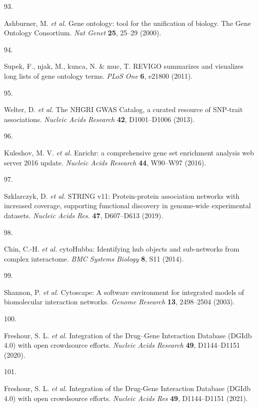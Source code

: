 \documentclass[
  11,
  a4paper,
]{article}
\newlength{\cslhangindent}
\newlength{\csllabelwidth}
\newlength{\cslentryspacingunit} %
\newenvironment{CSLReferences}[2] %
 {%
  \setlength{\parindent}{0pt}
  \ifodd #1
  \let\oldpar\par
  \def\par{\hangindent=\cslhangindent\oldpar}
  \fi
  \setlength{\parskip}{#2\cslentryspacingunit}
 }%
 {}
\newcommand{\CSLLeftMargin}[1]{\parbox[t]{\csllabelwidth}{#1}}
\newcommand{\CSLRightInline}[1]{\parbox[t]{\linewidth - \csllabelwidth}{#1}\break}
\begin{document}
\begin{CSLReferences}{0}{0}
\leavevmode{}%
\CSLLeftMargin{93. }%
\CSLRightInline{Ashburner, M. \emph{et al.} {{G}ene ontology: tool for
the unification of biology. {T}he {G}ene {O}ntology {C}onsortium}.
\emph{Nat Genet} \textbf{25}, 25--29 (2000).}

\leavevmode{}%
\CSLLeftMargin{94. }%
\CSLRightInline{Supek, F., njak, M., kunca, N. \& muc, T.
{{R}{E}{V}{I}{G}{O} summarizes and visualizes long lists of gene
ontology terms}. \emph{PLoS One} \textbf{6}, e21800 (2011).}

\leavevmode{}%
\CSLLeftMargin{95. }%
\CSLRightInline{Welter, D. \emph{et al.} {The NHGRI GWAS Catalog, a
curated resource of SNP-trait associations}. \emph{Nucleic Acids
Research} \textbf{42}, D1001--D1006 (2013).}

\leavevmode{}%
\CSLLeftMargin{96. }%
\CSLRightInline{Kuleshov, M. V. \emph{et al.} {Enrichr: a comprehensive
gene set enrichment analysis web server 2016 update}. \emph{Nucleic
Acids Research} \textbf{44}, W90--W97 (2016).}

\leavevmode{}%
\CSLLeftMargin{97. }%
\CSLRightInline{Szklarczyk, D. \emph{et al.} {STRING} v11:
Protein-protein association networks with increased coverage, supporting
functional discovery in genome-wide experimental datasets. \emph{Nucleic
Acids Res.} \textbf{47}, D607--D613 (2019).}

\leavevmode{}%
\CSLLeftMargin{98. }%
\CSLRightInline{Chin, C.-H. \emph{et al.} {cytoHubba}: Identifying hub
objects and sub-networks from complex interactome. \emph{BMC Systems
Biology} \textbf{8}, S11 (2014).}

\leavevmode{}%
\CSLLeftMargin{99. }%
\CSLRightInline{Shannon, P. \emph{et al.} Cytoscape: A software
environment for integrated models of biomolecular interaction networks.
\emph{Genome Research} \textbf{13}, 2498--2504 (2003).}

\leavevmode{}%
\CSLLeftMargin{100. }%
\CSLRightInline{Freshour, S. L. \emph{et al.} {Integration of the
Drug--Gene Interaction Database (DGIdb 4.0) with open crowdsource
efforts}. \emph{Nucleic Acids Research} \textbf{49}, D1144--D1151
(2020).}

\leavevmode{}%
\CSLLeftMargin{101. }%
\CSLRightInline{Freshour, S. L. \emph{et al.} {{I}ntegration of the
{D}rug-{G}ene {I}nteraction {D}atabase ({D}{G}{I}db 4.0) with open
crowdsource efforts}. \emph{Nucleic Acids Res} \textbf{49}, D1144--D1151
(2021).}

\end{CSLReferences}
\end{document}
